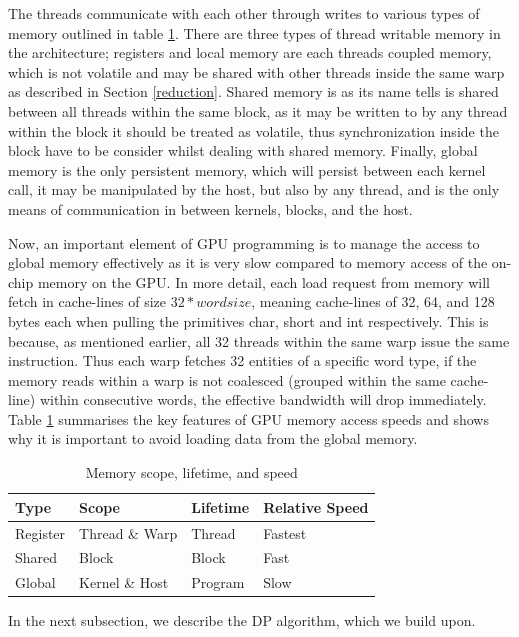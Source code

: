 \documentclass{llncs}
\begin{document}
The threads communicate with each other through writes to various types of memory outlined in table \ref{mem}. There are three types of thread writable memory in the architecture; registers and local memory are each threads coupled memory, which is not volatile and may be shared with other threads inside the same warp as described in Section \ref{reduction}.  Shared memory is as its name tells is shared between all threads within the same block, as it may be written to by any thread within the block it should be treated as volatile, thus synchronization inside the block have to be consider whilst dealing with shared memory. Finally, global memory is the only persistent memory, which will persist between each kernel call, it may be manipulated by the host, but also by any thread, and is the only means of communication in between kernels, blocks, and the host.

Now, an important element of GPU programming is to manage the access to global memory effectively as it is very slow compared to memory access of the on-chip memory on the GPU. In more detail, each load request from memory will fetch in cache-lines of size $32*wordsize$, meaning cache-lines of 32, 64, and 128 bytes each when pulling the primitives char, short and int respectively. This is because, as mentioned earlier, all 32 threads within the same warp issue the same instruction.  Thus each warp fetches 32 entities of a specific word type, if the memory reads within a warp is not coalesced (grouped within the same cache-line) within consecutive words, the effective bandwidth will drop immediately. Table \ref{mem} summarises the key features of GPU memory access speeds and shows why it is important to avoid loading data from the global memory.

\begin{table}
\centering
\caption{Memory scope, lifetime, and speed \label{mem}}
\begin{tabular}{|l|l|l|l|} \hline
Type&Scope&Lifetime&Relative Speed \\ \hline
Register&Thread \& Warp&Thread&Fastest\\
Shared&Block&Block&Fast\\
Global&Kernel \& Host&Program&Slow\\
\hline\end{tabular}
\end{table}
In the next subsection, we describe the DP algorithm, which we build upon.
\end{document}
